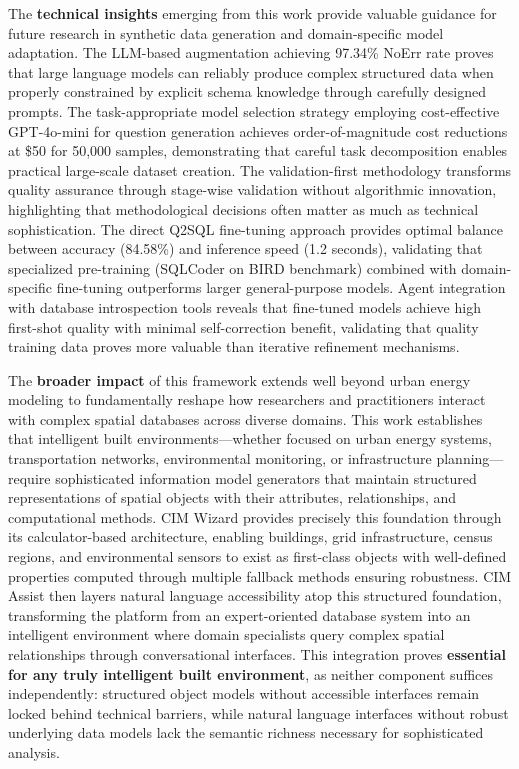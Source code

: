 The \textbf{technical insights} emerging from this work provide valuable guidance for future research in synthetic data generation and domain-specific model adaptation. The LLM-based augmentation achieving 97.34\% NoErr rate proves that large language models can reliably produce complex structured data when properly constrained by explicit schema knowledge through carefully designed prompts. The task-appropriate model selection strategy employing cost-effective GPT-4o-mini for question generation achieves order-of-magnitude cost reductions at \$50 for 50,000 samples, demonstrating that careful task decomposition enables practical large-scale dataset creation. The validation-first methodology transforms quality assurance through stage-wise validation without algorithmic innovation, highlighting that methodological decisions often matter as much as technical sophistication. The direct Q2SQL fine-tuning approach provides optimal balance between accuracy (84.58\%) and inference speed (1.2 seconds), validating that specialized pre-training (SQLCoder on BIRD benchmark) combined with domain-specific fine-tuning outperforms larger general-purpose models. Agent integration with database introspection tools reveals that fine-tuned models achieve high first-shot quality with minimal self-correction benefit, validating that quality training data proves more valuable than iterative refinement mechanisms.

The \textbf{broader impact} of this framework extends well beyond urban energy modeling to fundamentally reshape how researchers and practitioners interact with complex spatial databases across diverse domains. This work establishes that intelligent built environments---whether focused on urban energy systems, transportation networks, environmental monitoring, or infrastructure planning---require sophisticated information model generators that maintain structured representations of spatial objects with their attributes, relationships, and computational methods. CIM Wizard provides precisely this foundation through its calculator-based architecture, enabling buildings, grid infrastructure, census regions, and environmental sensors to exist as first-class objects with well-defined properties computed through multiple fallback methods ensuring robustness. CIM Assist then layers natural language accessibility atop this structured foundation, transforming the platform from an expert-oriented database system into an intelligent environment where domain specialists query complex spatial relationships through conversational interfaces. This integration proves \textbf{essential for any truly intelligent built environment}, as neither component suffices independently: structured object models without accessible interfaces remain locked behind technical barriers, while natural language interfaces without robust underlying data models lack the semantic richness necessary for sophisticated analysis.

